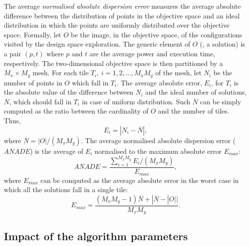 The average \emph{normalised absolute dispersion error} measures
the average absolute difference between the distribution of points in
the objective space and an ideal distribution in which the points are
uniformly distributed over the objective space. 
Formally, let $O$ be
the image, in the objective space, of the configurations visited by
the design space exploration. The generic element of $O$ (\ie, a
solution) is a pair $(p,t)$ where $p$ and $t$ are the average power
and execution time, respectively. The two-dimensional objective space
is then partitioned by a $M_x \times M_y$ mesh. For each tile $T_i,
\ i=1, 2, \ldots, M_xM_y$ of the mesh, let $N_i$ be the number
of points in $O$ which fall in $T_i$. The average absolute error, $E_i$, for
$T_i$ is the absolute value of the difference between $N_i$ and the
ideal number of solutions, $\overline{N}$, which should fall in $T_i$
in case of uniform distribution. Such $\overline{N}$ can be simply
computed as the ratio between the cardinality of $O$ and the number of
tiles. Thus,
\[ E_i = |N_i - \overline{N}|, \]
where $\overline{N} = |O| / (M_x M_y)$. The average
normalised absolute dispersion error ($ANADE$) is the average of $E_i$
normalised to the maximum absolute error $E_{max}$:
\[ ANADE = \frac{\sum_{i=1}^{M_xM_y} E_i/(M_xM_y)}{E_{max}}, \]
where $E_{max}$ can be computed as the average absolute error in the worst
case in which all the solutions fall in a single tile:
\[ E_{max} = \frac{(M_x M_y - 1) \overline{N} + |\overline{N} -
    |O|| }{M_x M_y}. \] 

\subsection{Impact of the algorithm parameters}


